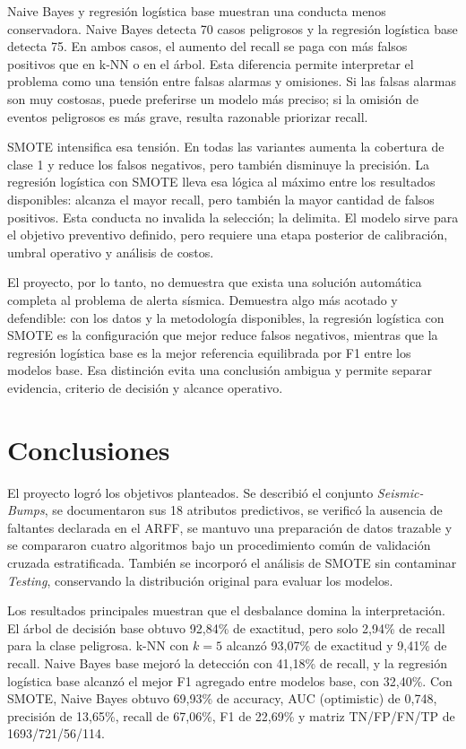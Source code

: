 \documentclass[12pt,a4paper]{article}
\begin{document}
Naive Bayes y regresión logística base muestran una conducta menos conservadora. Naive Bayes detecta 70 casos peligrosos y la regresión logística base detecta 75. En ambos casos, el aumento del recall se paga con más falsos positivos que en k-NN o en el árbol. Esta diferencia permite interpretar el problema como una tensión entre falsas alarmas y omisiones. Si las falsas alarmas son muy costosas, puede preferirse un modelo más preciso; si la omisión de eventos peligrosos es más grave, resulta razonable priorizar recall.

SMOTE intensifica esa tensión. En todas las variantes aumenta la cobertura de clase 1 y reduce los falsos negativos, pero también disminuye la precisión. La regresión logística con SMOTE lleva esa lógica al máximo entre los resultados disponibles: alcanza el mayor recall, pero también la mayor cantidad de falsos positivos. Esta conducta no invalida la selección; la delimita. El modelo sirve para el objetivo preventivo definido, pero requiere una etapa posterior de calibración, umbral operativo y análisis de costos.

El proyecto, por lo tanto, no demuestra que exista una solución automática completa al problema de alerta sísmica. Demuestra algo más acotado y defendible: con los datos y la metodología disponibles, la regresión logística con SMOTE es la configuración que mejor reduce falsos negativos, mientras que la regresión logística base es la mejor referencia equilibrada por F1 entre los modelos base. Esa distinción evita una conclusión ambigua y permite separar evidencia, criterio de decisión y alcance operativo.

\section{Conclusiones}
El proyecto logró los objetivos planteados. Se describió el conjunto \textit{Seismic-Bumps}, se documentaron sus 18 atributos predictivos, se verificó la ausencia de faltantes declarada en el ARFF, se mantuvo una preparación de datos trazable y se compararon cuatro algoritmos bajo un procedimiento común de validación cruzada estratificada. También se incorporó el análisis de SMOTE sin contaminar \textit{Testing}, conservando la distribución original para evaluar los modelos.

Los resultados principales muestran que el desbalance domina la interpretación. El árbol de decisión base obtuvo 92,84\% de exactitud, pero solo 2,94\% de recall para la clase peligrosa. k-NN con $k=5$ alcanzó 93,07\% de exactitud y 9,41\% de recall. Naive Bayes base mejoró la detección con 41,18\% de recall, y la regresión logística base alcanzó el mejor F1 agregado entre modelos base, con 32,40\%. Con SMOTE, Naive Bayes obtuvo 69,93\% de accuracy, AUC (optimistic) de 0,748, precisión de 13,65\%, recall de 67,06\%, F1 de 22,69\% y matriz TN/FP/FN/TP de 1693/721/56/114.
\end{document}

